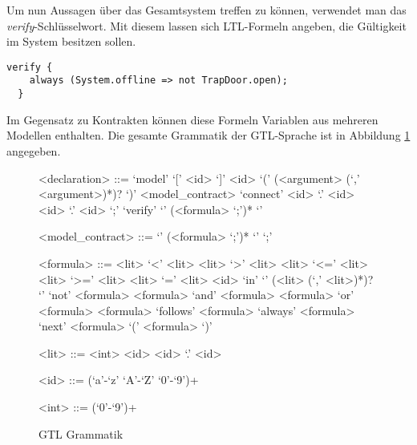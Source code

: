Um nun Aussagen über das Gesamtsystem treffen zu können, verwendet man das \emph{verify}-Schlüsselwort.
Mit diesem lassen sich LTL-Formeln angeben, die Gültigkeit im System besitzen sollen.
\begin{lstlisting}[language=gtl]
  verify {
    always (System.offline => not TrapDoor.open);
  }
\end{lstlisting}
Im Gegensatz zu Kontrakten können diese Formeln Variablen aus mehreren Modellen enthalten.
Die gesamte Grammatik der GTL-Sprache ist in Abbildung \ref{fig:grammar} angegeben.

\begin{figure}
  \centering
  \begin{grammar}
    <declaration> ::= `model' `[' <id> `]' <id> `(' (<argument> (`,' <argument>)*)? `)' <model\_contract>
    \alt `connect' <id> `.' <id> <id> `.' <id> `;'
    \alt `verify' `{' (<formula> `;')* `}'
    
    <model\_contract> ::= `{' (<formula> `;')* `}'
    \alt `;'
    
    <formula> ::= <lit> `<' <lit>
    \alt <lit> `>' <lit>
    \alt <lit> `<=' <lit>
    \alt <lit> `>=' <lit>
    \alt <lit> `=' <lit>
    \alt <id> `in' `{' (<lit> (`,' <lit>)*)? `}'
    \alt `not' <formula>
    \alt <formula> `and' <formula>
    \alt <formula> `or' <formula>
    \alt <formula> `follows' <formula>
    \alt `always' <formula>
    \alt `next' <formula>
    \alt `(' <formula> `)'
    
    <lit> ::= <int>
    \alt <id>
    \alt <id> `.' <id>
    
    <id> ::= (`a'-`z' `A'-`Z' `0'-`9')+
    
    <int> ::= (`0'-`9')+
  \end{grammar}
  \caption{GTL Grammatik}
  \label{fig:grammar}
\end{figure}





